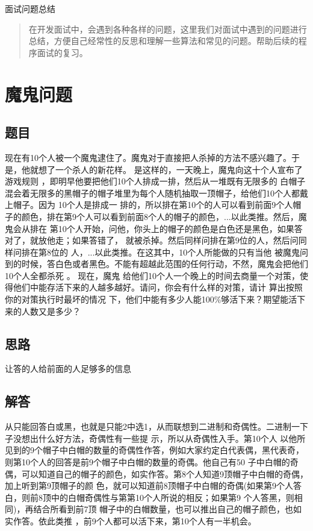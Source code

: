 \documentclass[UTF8]{ctexart}
\begin{document}
面试问题总结
\begin{abstract}
    在开发面试中，会遇到各种各样的问题，这里我们对面试中遇到的问题进行总结，方便自己经常性的反思和理解一些算法和常见的问题。帮助后续的程序面试的复习。
\end{abstract}
\section{魔鬼问题}
\subsection{题目}
现在有10个人被一个魔鬼逮住了。魔鬼对于直接把人杀掉的方法不感兴趣了。于是，他就想了一个杀人的新花样。
是这样的，一天晚上，魔鬼向这十个人宣布了游戏规则 ，即明早他要把他们10个人排成一排，然后从一堆既有无限多的
白帽子混会着无限多的黑帽子的帽子堆里为每个人随机抽取一顶帽子，给他们10个人都戴上帽子。因为 10个人是排成一
排的，所以排在第10个的人可以看到前面9个人帽子的颜色，排在第9个人可以看到前面8个人的帽子的颜色，...以此类推。然后，魔鬼会从排在 第10个人开始，问他，你头上的帽子的颜色是白色还是黑色，如果答对了，就放他走；如果答错了，
就被杀掉。然后同样问排在第9位的人，然后问同样问排在第8位的 人，...以此类推。在这其中，10个人所能做的只有当他
被魔鬼问到的时候，答白色或者黑色。不能有超越此范围的任何行动，不然，魔鬼会把他们10个人全都杀死 。 现在，魔鬼
给他们10个人一个晚上的时间去商量一个对策，使得他们中能存活下来的人越多越好。请问，你会有什么样的对策，请计
算出按照你的对策执行时最坏的情况 下，他们中能有多少人能100\%够活下来？期望能活下来的人数又是多少？
\subsection{思路}
 让答的人给前面的人足够多的信息
 \subsection{解答}
从只能回答白或黑，也就是只能2中选1，从而联想到二进制和奇偶性。二进制一下子没想出什么好方法，奇偶性有一些提
示，所以从奇偶性入手。第10个人 以他所见到的9个帽子中白帽的数量的奇偶性作答，例如大家约定白代表偶，黑代表奇，
则第10个人的回答是前9个帽子中白帽的数量的奇偶。他自己有50%
子中白帽的奇偶，可以知道自己的帽子的颜色，如实作答。第8个人知道9顶帽子中白帽的奇偶，加上听到第9顶帽子的颜 
色，就可以知道前8顶帽子中白帽的奇偶(如果第9个人答白，则前8顶中的白帽奇偶性与第第10个人所说的相反；如果第9
个人答黑，则相同)，再结合所看到前7顶 帽子中的白帽数量，也可以推出自己的帽子颜色，也如实作答。依此类推
，前9个人都可以活下来，第10个人有一半机会。
\end{document}
